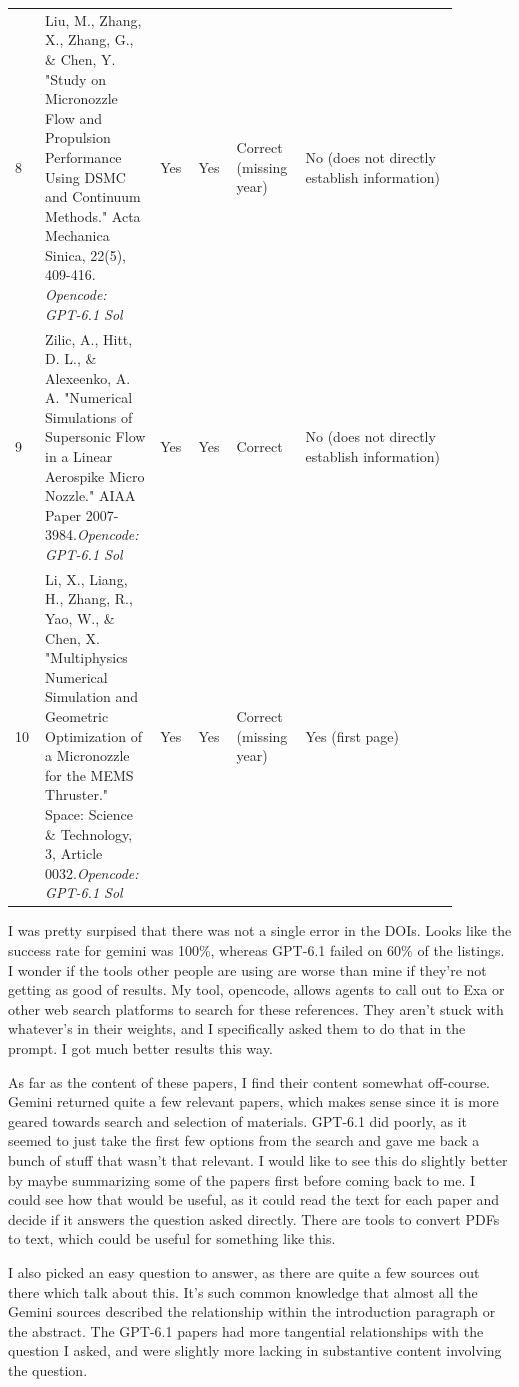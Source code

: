 \begin{longtable}{@{}p{0.06\linewidth}p{0.22\linewidth}p{0.08\linewidth}p{0.08\linewidth}p{0.12\linewidth}p{0.32\linewidth}@{}}
    8 & Liu, M., Zhang, X., Zhang, G., \& Chen, Y. "Study on Micronozzle Flow and Propulsion Performance Using DSMC and Continuum Methods." Acta Mechanica Sinica, 22(5), 409-416. \textit{Opencode: GPT-6.1 Sol} & Yes & Yes & Correct (missing year) & No (does not directly establish information) \\
    9 & Zilic, A., Hitt, D. L., \& Alexeenko, A. A. "Numerical Simulations of Supersonic Flow in a Linear Aerospike Micro Nozzle." AIAA Paper 2007-3984.\textit{Opencode: GPT-6.1 Sol} & Yes & Yes & Correct & No (does not directly establish information) \\
    10 & Li, X., Liang, H., Zhang, R., Yao, W., \& Chen, X. "Multiphysics Numerical Simulation and Geometric Optimization of a Micronozzle for the MEMS Thruster." Space: Science \& Technology, 3, Article 0032.\textit{Opencode: GPT-6.1 Sol} & Yes & Yes & Correct (missing year) & Yes (first page) \\
  \bottomrule
\end{longtable}

I was pretty surpised that there was not a single error in the DOIs. Looks like the success rate for gemini was 100\%, whereas GPT-6.1 failed on 60\% of the listings. I wonder if the tools other people are using are worse than mine if they're not getting as good of results. My tool, opencode, allows agents to call out to Exa or other web search platforms to search for these references. They aren't stuck with whatever's in their weights, and I specifically asked them to do that in the prompt. I got much better results this way.

As far as the content of these papers, I find their content somewhat off-course. Gemini returned quite a few relevant papers, which makes sense since it is more geared towards search and selection of materials. GPT-6.1 did poorly, as it seemed to just take the first few options from the search and gave me back a bunch of stuff that wasn't that relevant. I would like to see this do slightly better by maybe summarizing some of the papers first before coming back to me. I could see how that would be useful, as it could read the text for each paper and decide if it answers the question asked directly. There are tools to convert PDFs to text, which could be useful for something like this.

I also picked an easy question to answer, as there are quite a few sources out there which talk about this. It's such common knowledge that almost all the Gemini sources described the relationship within the introduction paragraph or the abstract. The GPT-6.1 papers had more tangential relationships with the question I asked, and were slightly more lacking in substantive content involving the question.

